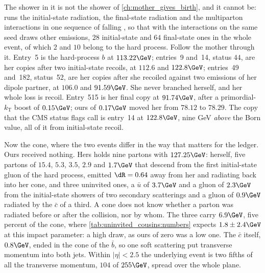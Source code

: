 The shower in it is not the shower of \cref{ch:mother_gives_birth}, and
it cannot be: \PYTHIA runs the initial-state radiation, the final-state
radiation and the multiparton interactions in one sequence of falling
\pt, so that with the interactions on the same seed draws other emissions,
$28$ initial-state and $64$ final-state ones in the whole event, of which
$2$ and $10$ belong to the hard process. Follow the mother through it.
Entry~5 is the hard-process $b$ at $113.22\GeV$; entries~9 and~14, status
$44$, are her copies after two initial-state recoils, at $112.6$ and
$122.8\GeV$; entries~49 and~182, status~52, are her copies after she
recoiled against two emissions of her dipole partner, at $106.0$ and
$91.59\GeV$. She never branched herself, and her whole loss is recoil.
Entry~515 is her final copy at $91.74\GeV$, after a
primordial-$k_{\mathrm{T}}$ boost of $0.15\GeV$; ours of $0.17\GeV$ moved her from $78.12$ to $78.29$.
The copy that the CMS status flags call  is
entry~14 at $122.8\GeV$, nine GeV \emph{above} the Born value, all of it
from initial-state recoil.

Now the cone, where the two events differ in the way that matters for
the ledger. Ours received nothing. Hers holds nine partons with
$127.25\GeV$: herself, five partons of $15.4$, $5.3$, $3.5$, $2.9$ and
$1.7\GeV$ that descend from the first initial-state gluon of the hard
process, emitted $\dR=0.64$ away from her and radiating back into her
cone, and three uninvited ones, a $\bar u$ of $3.7\GeV$ and a gluon of
$2.3\GeV$ from the initial-state showers of two secondary scatterings and
a gluon of $0.9\GeV$ radiated by the $\bar c$ of a third. A cone does not
know whether a parton was radiated before or after the collision, nor by
whom. The three carry $6.9\GeV$, five percent of the cone, where
\cref{tab:uninvited_cousins:numbers} expects $1.8\pm2.4\GeV$ at this
impact parameter: a high draw, as ours of zero was a low one. The
$\bar c$ itself, $0.8\GeV$, ended in the cone of the $\bar b$, so one soft
scattering put transverse momentum into both jets. Within $|\eta|<2.5$ the
underlying event is two fifths of all the transverse momentum, $104$ of
$255\GeV$, spread over the whole plane.


